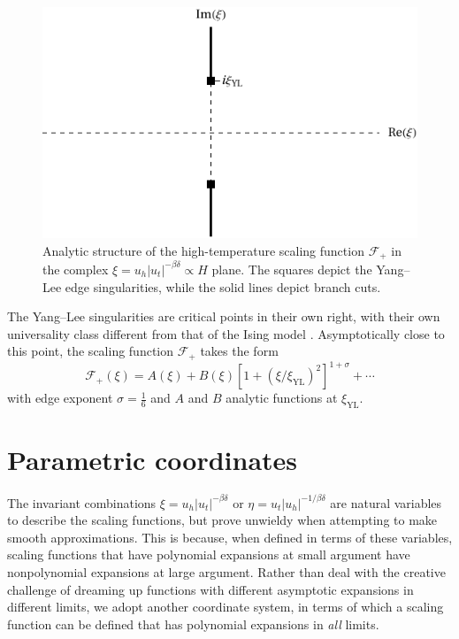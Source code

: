 \documentclass[
  aps,
  pre,
  preprint,
  longbibliography,
  floatfix
]{revtex4-2}
\begin{document}
\begin{figure}
  \includegraphics{figs/F_higher_singularities.pdf}
  \caption{
    Analytic structure of the high-temperature scaling function $\mathcal F_+$
    in the complex $\xi=u_h|u_t|^{-\beta\delta}\propto H$ plane. The squares
    depict the Yang--Lee edge singularities, while the solid lines depict
    branch cuts.
  } \label{fig:higher.singularities}
\end{figure}

The Yang--Lee singularities are critical points in their own right, with their
own universality class different from that of the Ising model
\cite{Fisher_1978_Yang-Lee}. Asymptotically close to this point, the scaling
function $\mathcal F_+$ takes the form
\begin{equation} \label{eq:yang.lee.sing}
  \mathcal F_+(\xi)
  =A(\xi) +B(\xi)[1+(\xi/\xi_{\mathrm{YL}})^2]^{1+\sigma}+\cdots
\end{equation}
with edge exponent $\sigma=\frac16$ and $A$ and $B$ analytic functions at
$\xi_\mathrm{YL}$.

\cite{Cardy_1985_Conformal}

\section{Parametric coordinates}

The invariant combinations $\xi=u_h|u_t|^{-\beta\delta}$ or
$\eta=u_t|u_h|^{-1/\beta\delta}$ are natural variables to describe the scaling
functions, but prove unwieldy when attempting to make smooth approximations.
This is because, when defined in terms of these variables, scaling functions
that have polynomial expansions at small argument have nonpolynomial expansions
at large argument. Rather than deal with the creative challenge of dreaming up
functions with different asymptotic expansions in different limits, we adopt
another coordinate system, in terms of which a scaling function can be defined
that has polynomial expansions in \emph{all} limits.
\end{document}
